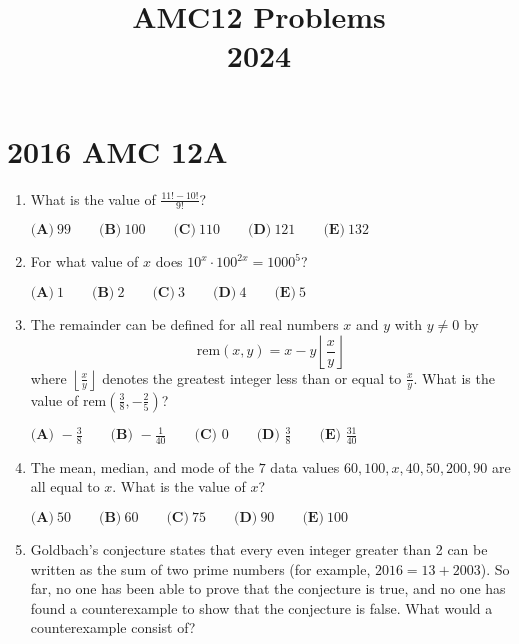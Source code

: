 \documentclass{article}
\title{AMC12 Problems \\ 2024}
\date{}
\begin{document}
\maketitle\thispagestyle{fancy}\newpage\section*{2016 AMC 12A}\begin{enumerate}[label=\arabic*., itemsep=0.5em]\item What is the value of \(\frac{11!-10!}{9!}\)?

\(\textbf{(A)}\ 99\qquad\textbf{(B)}\ 100\qquad\textbf{(C)}\ 110\qquad\textbf{(D)}\ 121\qquad\textbf{(E)}\ 132\)\par \vspace{0.5em}\item For what value of \(x\) does \(10^x \cdot 100^{2x} = 1000^5\)?

\(\textbf{(A)}\ 1\qquad\textbf{(B)}\ 2\qquad\textbf{(C)}\ 3\qquad\textbf{(D)}\ 4\qquad\textbf{(E)}\ 5\)\par \vspace{0.5em}\item The remainder can be defined for all real numbers \(x\) and \(y\) with \(y \neq 0\) by 
\begin{equation*}
\text{rem} (x ,y)=x-y\left \lfloor \frac{x}{y} \right \rfloor
\end{equation*}
where \(\left \lfloor \tfrac{x}{y} \right \rfloor\) denotes the greatest integer less than or equal to \(\tfrac{x}{y}\). What is the value of \(\text{rem} (\tfrac{3}{8}, -\tfrac{2}{5} )\)?

\(\textbf{(A) } -\frac{3}{8} \qquad \textbf{(B) } -\frac{1}{40} \qquad \textbf{(C) } 0 \qquad \textbf{(D) } \frac{3}{8} \qquad \textbf{(E) } \frac{31}{40}\)\par \vspace{0.5em}\item The mean, median, and mode of the \(7\) data values \(60, 100, x, 40, 50, 200, 90\) are all equal to \(x\). What is the value of \(x\)?

\(\textbf{(A)}\ 50\qquad\textbf{(B)}\ 60\qquad\textbf{(C)}\ 75\qquad\textbf{(D)}\ 90\qquad\textbf{(E)}\ 100\)\par \vspace{0.5em}\item Goldbach's conjecture states that every even integer greater than 2 can be written as the sum of two prime numbers (for example, \(2016=13+2003\)). So far, no one has been able to prove that the conjecture is true, and no one has found a counterexample to show that the conjecture is false. What would a counterexample consist of?


\end{enumerate}
\end{document}
